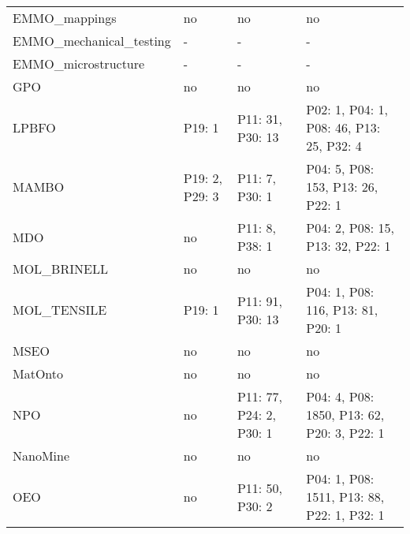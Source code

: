 \begin{tabular}{m{5cm}m{3cm}m{3cm}m{3cm}}
          EMMO_mappings &                      no &                                      no &                                                no \\
EMMO_mechanical_testing &                       - &                                       - &                                                 - \\
    EMMO_microstructure &                       - &                                       - &                                                 - \\
                    GPO &                      no &                                      no &                                                no \\
                  LPBFO &                  P19: 1 &                        P11: 31, P30: 13 &          P02: 1, P04: 1, P08: 46, P13: 25, P32: 4 \\
                  MAMBO &          P19: 2, P29: 3 &                          P11: 7, P30: 1 &                 P04: 5, P08: 153, P13: 26, P22: 1 \\
                    MDO &                      no &                          P11: 8, P38: 1 &                  P04: 2, P08: 15, P13: 32, P22: 1 \\
            MOL_BRINELL &                      no &                                      no &                                                no \\
            MOL_TENSILE &                  P19: 1 &                        P11: 91, P30: 13 &                 P04: 1, P08: 116, P13: 81, P20: 1 \\
                   MSEO &                      no &                                      no &                                                no \\
                MatOnto &                      no &                                      no &                                                no \\
                    NPO &                      no &                 P11: 77, P24: 2, P30: 1 &        P04: 4, P08: 1850, P13: 62, P20: 3, P22: 1 \\
               NanoMine &                      no &                                      no &                                                no \\
                    OEO &                      no &                         P11: 50, P30: 2 &        P04: 1, P08: 1511, P13: 88, P22: 1, P32: 1 \\

\end{tabular}
